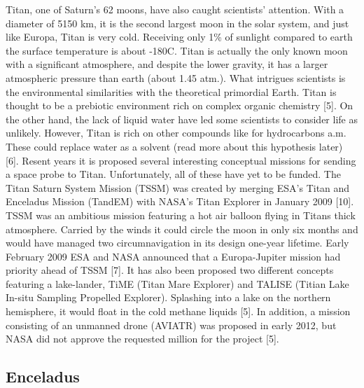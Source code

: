 Titan, one of Saturn's 62 moons, have also caught scientists' attention.
With a diameter of 5150 km, it is the second largest moon in the solar system, and just like Europa, Titan is very cold.
Receiving only 1\% of sunlight compared to earth the surface temperature is about -180\degree C.
Titan is actually the only known moon with a significant atmosphere, and despite the lower gravity, it has a larger atmospheric pressure than earth (about 1.45 atm.).
What intrigues scientists is the environmental similarities with the theoretical primordial Earth.
Titan is thought to be a prebiotic environment rich on complex organic chemistry [5]. On the other hand, the lack of liquid water have led some scientists to consider life as unlikely.
However, Titan is rich on other compounds like for hydrocarbons a.m.
These could replace water as a solvent (read more about this hypothesis later) [6].
Resent years it is proposed several interesting conceptual missions for sending a space probe to Titan. Unfortunately, all of these have yet to be funded.
The Titan Saturn System Mission (TSSM) was created by merging ESA’s Titan and Enceladus Mission (TandEM) with NASA’s Titan Explorer in January 2009 [10].
TSSM was an ambitious mission featuring a hot air balloon flying in Titans thick atmosphere.
Carried by the winds it could circle the moon in only six months and would have managed two circumnavigation in its design one-year lifetime.
Early February 2009 ESA and NASA announced that a Europa-Jupiter mission had priority ahead of TSSM [7]. 
It has also been proposed two different concepts featuring a lake-lander, TiME (Titan Mare Explorer) and TALISE (Titian Lake In-situ Sampling Propelled Explorer).
Splashing into a lake on the northern hemisphere, it would float in the cold methane liquids [5].
In addition, a mission consisting of an unmanned drone (AVIATR) was proposed in early 2012, but NASA did not approve the requested  million for the project [5].

\subsection*{Enceladus}
 
